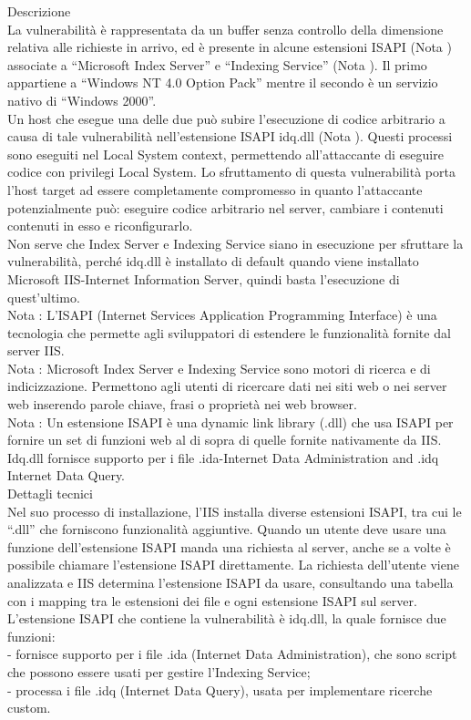 Descrizione\\
La vulnerabilità è rappresentata da un buffer senza controllo della dimensione relativa alle richieste in arrivo, ed è presente in alcune estensioni ISAPI (Nota ) associate a “Microsoft Index Server” e “Indexing Service” (Nota ). Il primo appartiene a “Windows NT 4.0 Option Pack” mentre il secondo è un servizio nativo di “Windows 2000”.\\
Un host che esegue una delle due può subire l’esecuzione di codice arbitrario a causa di tale vulnerabilità nell’estensione ISAPI idq.dll (Nota ). Questi processi sono eseguiti nel Local System context, permettendo all’attaccante di eseguire codice con privilegi Local System. Lo sfruttamento di questa vulnerabilità porta l’host target ad essere completamente compromesso in quanto l’attaccante potenzialmente può: eseguire codice arbitrario nel server, cambiare i contenuti contenuti in esso e riconfigurarlo.\\
Non serve che Index Server e Indexing Service siano in esecuzione per sfruttare la vulnerabilità, perché idq.dll è installato di default quando viene installato Microsoft IIS-Internet Information Server, quindi basta l’esecuzione di quest’ultimo.\\

Nota : L’ISAPI (Internet Services Application Programming Interface) è una tecnologia che permette agli sviluppatori di estendere le funzionalità fornite dal server IIS.\\
Nota : Microsoft Index Server e Indexing Service sono motori di ricerca e di indicizzazione. Permettono agli utenti di ricercare dati nei siti web o nei server web inserendo parole chiave, frasi o proprietà nei web browser.\\
Nota : Un estensione ISAPI è una dynamic link library (.dll) che usa ISAPI per fornire un set di funzioni web al di sopra di quelle fornite nativamente da IIS.\\
Idq.dll fornisce supporto per i file .ida-Internet Data Administration and .idq Internet Data Query.\\

Dettagli tecnici\\
Nel suo processo di installazione, l’IIS installa diverse estensioni ISAPI, tra cui le “.dll” che forniscono funzionalità aggiuntive.
Quando un utente deve usare una funzione dell’estensione ISAPI manda una richiesta al server, anche se a volte è possibile chiamare l’estensione ISAPI direttamente. La richiesta dell’utente viene analizzata e IIS determina l’estensione ISAPI da usare, consultando una tabella con i mapping tra le estensioni dei file e ogni estensione ISAPI sul server.\\
L’estensione ISAPI che contiene la vulnerabilità è idq.dll, la quale fornisce due funzioni:\\
- fornisce supporto per i file .ida (Internet Data Administration), che sono script che possono essere usati per gestire l’Indexing Service;\\
- processa i file .idq (Internet Data Query), usata per implementare ricerche custom.\\

